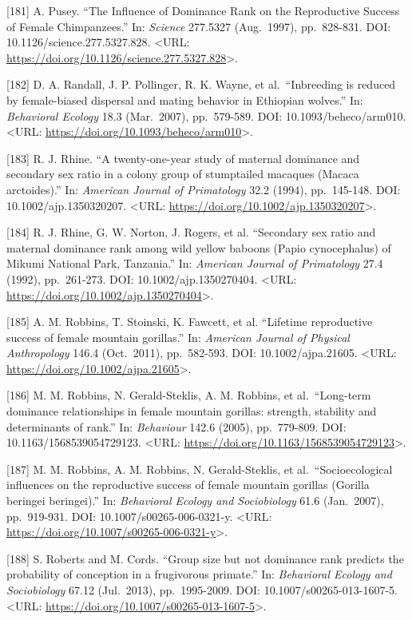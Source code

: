 \documentclass[
]{article}
\begin{document}
{[}181{]} A. Pusey. ``The Influence of Dominance Rank on the
Reproductive Success of Female Chimpanzees.'' In: \emph{Science}
277.5327 (Aug.~1997), pp.~828-831. DOI: 10.1126/science.277.5327.828.
\textless URL:
\url{https://doi.org/10.1126/science.277.5327.828}\textgreater.

{[}182{]} D. A. Randall, J. P. Pollinger, R. K. Wayne, et
al.~``Inbreeding is reduced by female-biased dispersal and mating
behavior in Ethiopian wolves.'' In: \emph{Behavioral Ecology} 18.3
(Mar.~2007), pp.~579-589. DOI: 10.1093/beheco/arm010. \textless URL:
\url{https://doi.org/10.1093/beheco/arm010}\textgreater.

{[}183{]} R. J. Rhine. ``A twenty-one-year study of maternal dominance
and secondary sex ratio in a colony group of stumptailed macaques
(Macaca arctoides).'' In: \emph{American Journal of Primatology} 32.2
(1994), pp.~145-148. DOI: 10.1002/ajp.1350320207. \textless URL:
\url{https://doi.org/10.1002/ajp.1350320207}\textgreater.

{[}184{]} R. J. Rhine, G. W. Norton, J. Rogers, et al. ``Secondary sex
ratio and maternal dominance rank among wild yellow baboons (Papio
cynocephalus) of Mikumi National Park, Tanzania.'' In: \emph{American
Journal of Primatology} 27.4 (1992), pp.~261-273. DOI:
10.1002/ajp.1350270404. \textless URL:
\url{https://doi.org/10.1002/ajp.1350270404}\textgreater.

{[}185{]} A. M. Robbins, T. Stoinski, K. Fawcett, et al. ``Lifetime
reproductive success of female mountain gorillas.'' In: \emph{American
Journal of Physical Anthropology} 146.4 (Oct.~2011), pp.~582-593. DOI:
10.1002/ajpa.21605. \textless URL:
\url{https://doi.org/10.1002/ajpa.21605}\textgreater.

{[}186{]} M. M. Robbins, N. Gerald-Steklis, A. M. Robbins, et
al.~``Long-term dominance relationships in female mountain gorillas:
strength, stability and determinants of rank.'' In: \emph{Behaviour}
142.6 (2005), pp.~779-809. DOI: 10.1163/1568539054729123. \textless URL:
\url{https://doi.org/10.1163/1568539054729123}\textgreater.

{[}187{]} M. M. Robbins, A. M. Robbins, N. Gerald-Steklis, et
al.~``Socioecological influences on the reproductive success of female
mountain gorillas (Gorilla beringei beringei).'' In: \emph{Behavioral
Ecology and Sociobiology} 61.6 (Jan.~2007), pp.~919-931. DOI:
10.1007/s00265-006-0321-y. \textless URL:
\url{https://doi.org/10.1007/s00265-006-0321-y}\textgreater.

{[}188{]} S. Roberts and M. Cords. ``Group size but not dominance rank
predicts the probability of conception in a frugivorous primate.'' In:
\emph{Behavioral Ecology and Sociobiology} 67.12 (Jul.~2013),
pp.~1995-2009. DOI: 10.1007/s00265-013-1607-5. \textless URL:
\url{https://doi.org/10.1007/s00265-013-1607-5}\textgreater.
\end{document}
